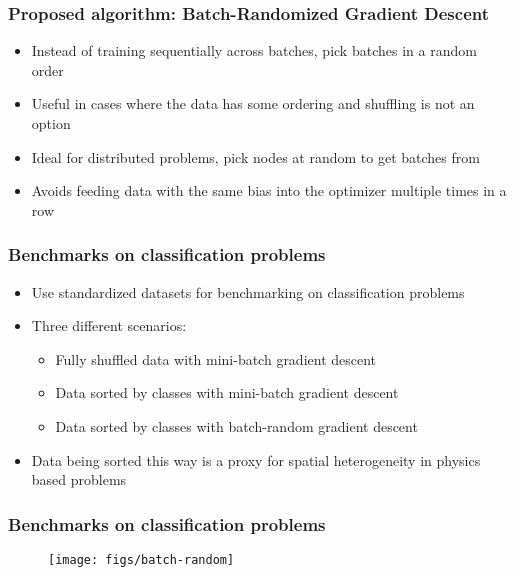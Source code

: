 \documentclass[aspectratio=169]{beamer}
\begin{document}
\begin{frame}
    \frametitle{Proposed algorithm: Batch-Randomized Gradient Descent}
    \begin{itemize}
        \item Instead of training sequentially across batches, pick batches in a random order
        \item Useful in cases where the data has some ordering and shuffling is not an option
        \item Ideal for distributed problems, pick nodes at random to get batches from
        \item Avoids feeding data with the same bias into the optimizer multiple times in a row
    \end{itemize}
\end{frame}
\begin{frame}
    \frametitle{Benchmarks on classification problems}
    \begin{itemize}
        \item Use standardized datasets for benchmarking on classification problems
        \item Three different scenarios:
            \begin{itemize}
                \item Fully shuffled data with mini-batch gradient descent
                \item Data sorted by classes with mini-batch gradient descent
                \item Data sorted by classes with batch-random gradient descent
            \end{itemize}
        \item Data being sorted this way is a proxy for spatial heterogeneity in physics based problems
    \end{itemize}
\end{frame}
\begin{frame}
    \frametitle{Benchmarks on classification problems}
    \begin{figure}
        \centering
        \texttt{[image: figs/batch-random]}
    \end{figure}
\end{frame}
\end{document}
